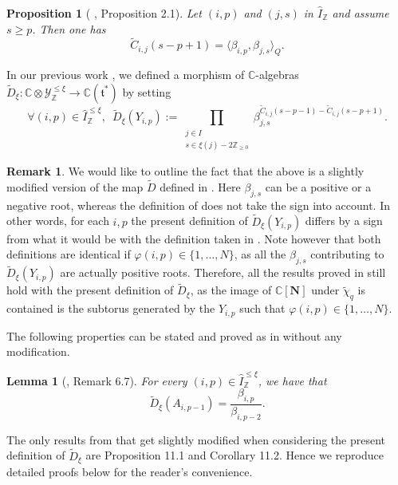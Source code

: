 \documentclass[12pt]{amsart}
\theoremstyle{plain}
\newtheorem{proposition}[theorem]{Proposition}
\newtheorem{lemma}[theorem]{Lemma}
\theoremstyle{definition}
\newtheorem{remark}[theorem]{Remark}
\numberwithin{equation}{section}
\newcommand{\tchi}{{\widetilde{\chi}}}
\newcommand{\td}{{\widetilde{D}}}
\newcommand{\IZ}{\widehat{I}_{\mathbb{Z}}}
\newcommand{\IxiZ}{\widehat{I}_{\mathbb{Z}}^{ \leq \xi}}
\newcommand{\tdxi}{\widetilde{D}_{\xi}}
\newcommand{\CN}{\mathbb{C}[\mathbf{N}]}
\newcommand{\YxiZ}{\mathcal{Y}_{\mathbb{Z}}^{\leq \xi}}
\begin{document}
\begin{proposition}[ \cite{HL15}, Proposition 2.1] \label{prop : reminders on Ctilde}
Let $(i,p)$ and $(j,s)$ in $\IZ$ and assume  $s \geq p$. Then one has
    $$ \tilde{C}_{i,j}(s-p+1) = \langle \beta_{i,p} ,  \beta_{j,s} \rangle_Q . $$
\end{proposition}

 
 
In our previous work \cite{CasbiLi}, we defined a morphism of $\mathbb{C}$-algebras $\tdxi : \mathbb{C} \otimes \YxiZ \longrightarrow \mathbb{C}(\mathfrak{t}^{*})$ by setting 
   $$ \forall (i,p) \in \IxiZ, \enspace \tdxi (Y_{i,p}) := \prod_{  \substack{j \in I \\ s \in \xi(j)- 2 \mathbb{Z}_{\geq 0}} } \beta_{j,s}^{\tilde{C}_{i,j}(s-p-1) - \tilde{C}_{i,j}(s-p+1)} . $$

   \begin{remark} \label{rk : remark on new Dtilde}
 We would like to outline the fact that the above is a slightly modified version of the map $\td$ defined in \cite{CasbiLi}. Here $\beta_{j,s}$ can be a positive or a negative root, whereas the definition of \cite{CasbiLi} does not take the sign into account. In other words, for each $i,p$ the present definition of $\tdxi(Y_{i,p})$ differs by a sign from what it would be with the definition taken in \cite{CasbiLi}.  Note however that both definitions are identical if $\varphi(i,p) \in \{1, \ldots , N\}$, as all the $\beta_{j,s}$ contributing to $\td_{\xi}(Y_{i,p})$ are actually positive roots. Therefore, all the results proved in \cite{CasbiLi} still hold with the present definition of $\td_{\xi}$, as the image of $\CN$ under $\tchi_q$ is contained is the subtorus generated by the $Y_{i,p}$ such that $\varphi(i,p) \in \{1, \ldots , N\}$. 
 \end{remark}

  The following properties can be stated and proved as in \cite{CasbiLi} without any modification.


   \begin{lemma}[\cite{CasbiLi}, Remark 6.7] \label{lem : Dtilde of As}
    For every $(i,p) \in  \IxiZ$, we have that 
    $$ \tdxi(A_{i,p-1}) = \frac{\beta_{i,p}}{\beta_{i,p-2}} .  $$
   \end{lemma}


 The only results from \cite{CasbiLi} that get slightly modified when considering the present definition of $\tdxi$ are Proposition 11.1 and Corollary 11.2. Hence we reproduce detailed proofs below for the reader's convenience. 
\end{document}
